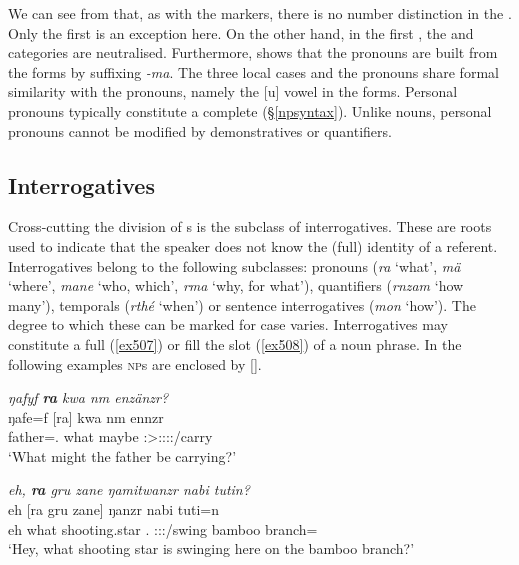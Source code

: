 We can see from  that, as with the  markers, there is no number distinction in the . Only the first  is an exception here. On the other hand, in the first  , the  and  categories are neutralised. Furthermore,  shows that the  pronouns are built from the  forms by suffixing \emph{-ma}. The three local cases and the  pronouns share formal similarity with the  pronouns, namely the [u] vowel in the  forms. Personal pronouns typically constitute a complete  (\S{}\ref{npsyntax}). Unlike nouns, personal pronouns cannot be modified by demonstratives or quantifiers.

\subsection{Interrogatives} \label{interrogatives}

Cross-cutting the division of s is the subclass of interrogatives. These are roots used to indicate that the speaker does not know the (full) identity of a referent. Interrogatives belong to the following  subclasses: pronouns (\emph{ra} `what', \emph{mä} `where', \emph{mane} `who, which', \emph{rma} `why, for what'), quantifiers (\emph{rnzam} `how many'), temporals (\emph{rthé} `when') or sentence interrogatives (\emph{mon} `how'). The degree to which these can be marked for case varies. Interrogatives may constitute a full  (\ref{ex507}) or fill the  slot (\ref{ex508}) of a noun phrase. In the following examples \textsc{np}s are enclosed by [].

\begin{exe}
	\ex \emph{ŋafyf \textbf{ra} kwa nm enzänzr?}\\
	\gll ŋafe=f [ra] kwa nm ennzr\\
	father=\Erg.\Sg{} what \Fut{} maybe \Stsg:\Sbj>\Stpl:\Obj:\Nonpast:\Ipfv:\Venit/carry\\
	\trans `What might the father be carrying?' 
	\label{ex507}
\end{exe}
\begin{exe}
	\ex \emph{eh, \textbf{ra} gru zane ŋamitwanzr nabi tutin?}\\
	\gll eh [ra gru zane] ŋanzr nabi tuti=n\\
	eh what shooting.star \Dem.\Prox{} \Stsg:\Sbj:\Nonpast:\Ipfv/swing bamboo branch=\Loc{}\\
	\trans `Hey, what shooting star is swinging here on the bamboo branch?'\\ 
	\label{ex508}
\end{exe}%


